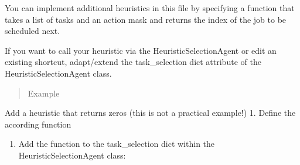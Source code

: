 \documentclass[letterpaper,10pt,english]{sphinxmanual}
\begin{document}
\sphinxAtStartPar
You can implement additional heuristics in this file by specifying a function that takes a list of tasks and an action
mask and returns the index of the job to be scheduled next.

\sphinxAtStartPar
If you want to call your heuristic via the HeuristicSelectionAgent or edit an existing shortcut,
adapt/extend the task\_selection dict attribute of the HeuristicSelectionAgent class.
\begin{quote}\begin{description}
\item[{Example}] \leavevmode
\end{description}\end{quote}

\sphinxAtStartPar
Add a heuristic that returns zeros (this is not a practical example!)
1. Define the according function

\begin{sphinxVerbatim}[commandchars=\\\{\}]
  \PYG{p}{[}\PYG{p}{]}    
     
\end{sphinxVerbatim}
\begin{enumerate}
%
\setcounter{enumi}{1}
\item {} 
\sphinxAtStartPar
Add the function to the task\_selection dict within the HeuristicSelectionAgent class:

\end{enumerate}

\begin{sphinxVerbatim}[commandchars=\\\{\}]
  
     
     
     
     
     
     
\end{sphinxVerbatim}
\end{document}
